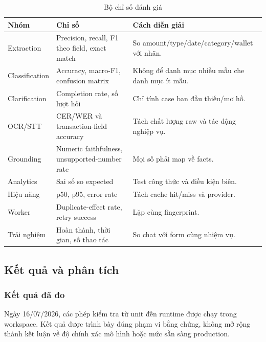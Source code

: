 \begin{table}[H]
  \centering
  \caption{Bộ chỉ số đánh giá}
  \label{tab:metrics}
  \begin{tabularx}{\textwidth}{@{}L{3.2cm}L{5.2cm}Y@{}}
    \toprule
    \textbf{Nhóm} & \textbf{Chỉ số} & \textbf{Cách diễn giải} \\
    \midrule
    Extraction & Precision, recall, F1 theo field, exact match & So amount/type/date/category/wallet với nhãn. \\
    Classification & Accuracy, macro-F1, confusion matrix & Không để danh mục nhiều mẫu che danh mục ít mẫu. \\
    Clarification & Completion rate, số lượt hỏi & Chỉ tính case ban đầu thiếu/mơ hồ. \\
    OCR/STT & CER/WER và transaction-field accuracy & Tách chất lượng raw và tác động nghiệp vụ. \\
    Grounding & Numeric faithfulness, unsupported-number rate & Mọi số phải map về facts. \\
    Analytics & Sai số so expected & Test công thức và điều kiện biên. \\
    Hiệu năng & p50, p95, error rate & Tách cache hit/miss và provider. \\
    Worker & Duplicate-effect rate, retry success & Lặp cùng fingerprint. \\
    Trải nghiệm & Hoàn thành, thời gian, số thao tác & So chat với form cùng nhiệm vụ. \\
    \bottomrule
  \end{tabularx}
\end{table}

\subsection{Kết quả và phân tích}

\subsubsection{Kết quả đã đo}

Ngày 16/07/2026, các phép kiểm tra từ unit đến runtime được chạy trong workspace. Kết quả được trình bày đúng phạm vi bằng chứng, không mở rộng thành kết luận về độ chính xác mô hình hoặc mức sẵn sàng production.

